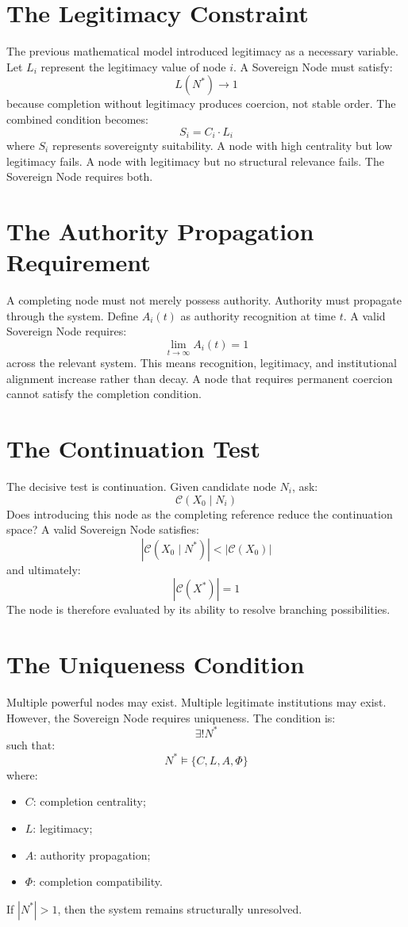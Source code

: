 \documentclass[11pt,openany]{book}
\theoremstyle{plain}
\theoremstyle{definition}
\begin{document}
\section{The Legitimacy Constraint}

The previous mathematical model introduced legitimacy as a necessary variable. Let \(L_i\) represent the legitimacy value of node \(i\). A Sovereign Node must satisfy:
\[
L(N^*) \to 1
\]
because completion without legitimacy produces coercion, not stable order. The combined condition becomes:
\[
S_i = C_i \cdot L_i
\]
where \(S_i\) represents sovereignty suitability. A node with high centrality but low legitimacy fails. A node with legitimacy but no structural relevance fails. The Sovereign Node requires both.

\section{The Authority Propagation Requirement}

A completing node must not merely possess authority. Authority must propagate through the system. Define \(A_i(t)\) as authority recognition at time \(t\). A valid Sovereign Node requires:
\[
\lim_{t \to \infty} A_i(t) = 1
\]
across the relevant system. This means recognition, legitimacy, and institutional alignment increase rather than decay. A node that requires permanent coercion cannot satisfy the completion condition.

\section{The Continuation Test}

The decisive test is continuation. Given candidate node \(N_i\), ask:
\[
\mathcal{C}(X_0 \mid N_i)
\]
Does introducing this node as the completing reference reduce the continuation space? A valid Sovereign Node satisfies:
\[
|\mathcal{C}(X_0 \mid N^*)| < |\mathcal{C}(X_0)|
\]
and ultimately:
\[
|\mathcal{C}(X^*)| = 1
\]
The node is therefore evaluated by its ability to resolve branching possibilities.

\section{The Uniqueness Condition}

Multiple powerful nodes may exist. Multiple legitimate institutions may exist. However, the Sovereign Node requires uniqueness. The condition is:
\[
\exists ! N^*
\]
such that:
\[
N^* \models \{C, L, A, \Phi\}
\]
where:
\begin{itemize}
\item \(C\): completion centrality;
\item \(L\): legitimacy;
\item \(A\): authority propagation;
\item \(\Phi\): completion compatibility.
\end{itemize}
If \(|N^*| > 1\), then the system remains structurally unresolved.
\end{document}
